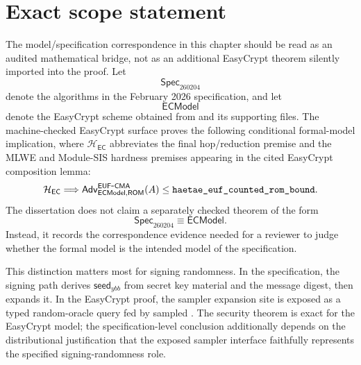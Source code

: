 \section{Exact scope statement}
\label{sec:model-spec-exact-scope}

The model/specification correspondence in this chapter should be read as an
audited mathematical bridge, not as an additional EasyCrypt theorem silently
imported into the proof.  Let
\[
  \mathsf{Spec}_{260204}
\]
denote the algorithms in the February 2026 specification, and let
\[
  \mathsf{ECModel}
\]
denote the EasyCrypt scheme obtained from  and its
supporting files.  The machine-checked EasyCrypt surface proves the following
conditional formal-model implication, where \(\mathcal{H}_{\mathsf{EC}}\)
abbreviates the final hop/reduction premise and the MLWE and Module-SIS
hardness premises appearing in the cited EasyCrypt composition lemma:
\[
  \mathcal{H}_{\mathsf{EC}}
  \Longrightarrow
  \mathsf{Adv}_{\mathsf{ECModel},\mathsf{ROM}}^{\mathsf{EUF}\mbox{-}\mathsf{CMA}}(A)
  \le
  \texttt{haetae\_euf\_counted\_rom\_bound}.
\]
The dissertation does not claim a separately checked theorem of the form
\[
  \mathsf{Spec}_{260204}\equiv\mathsf{ECModel}.
\]
Instead, it records the correspondence evidence needed for a reviewer to judge
whether the formal model is the intended model of the specification.

This distinction matters most for signing randomness.  In the specification,
the signing path derives \(\mathsf{seed}_{ybb}\) from secret key material and the
message digest, then expands it.  In the EasyCrypt proof, the sampler expansion
site is exposed as a typed random-oracle query fed by sampled
.  The security theorem is exact for the EasyCrypt model; the
specification-level conclusion additionally depends on the distributional
justification that the exposed sampler interface faithfully represents the
specified signing-randomness role.

